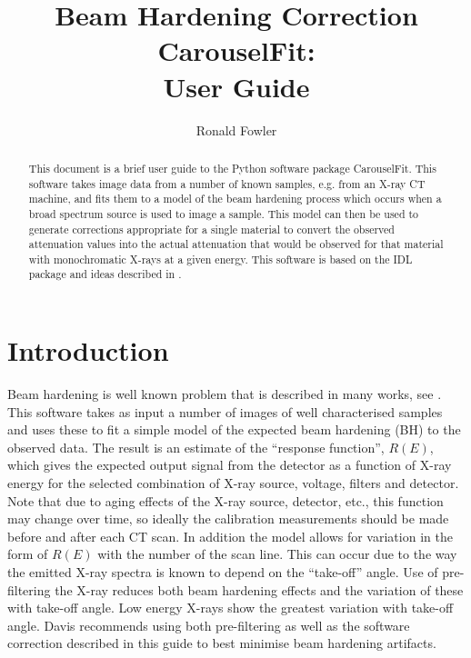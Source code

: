 \documentclass[a4paper,12pt]{article}
\begin{document}
\title{Beam Hardening Correction CarouselFit: \\ User Guide}
\author{Ronald Fowler}

\maketitle

\begin{abstract}
This document is a brief user guide to the Python software package CarouselFit. This software takes image
data from a number of known samples, e.g. from an X-ray CT machine, and fits them to a model of
the beam hardening process which occurs when a broad spectrum source is used to image a sample.
This model can then be used to generate corrections appropriate for a single material to convert
the observed attenuation values into the actual attenuation that would be observed for that material
with monochromatic X-rays at a given energy.
This software is based on the IDL package and ideas described in \cite{davis}.
\end{abstract}

\section{Introduction}

Beam hardening is well known problem that is described in many works, see \cite{davis}.
This software takes as input a number of images of well characterised samples and uses these
to fit a simple model of the expected beam hardening (BH) to the observed data.
The result is an estimate of the ``response function'', $R(E)$, which gives the expected output signal
from the detector as a function of X-ray energy for the selected combination of X-ray source, voltage, filters
and detector.
Note that due to aging effects of the X-ray source, detector, etc., this function may change over time,
so ideally the calibration measurements should be made before and after each CT scan.
In addition the model allows for variation in the form of $R(E)$ with the number of the scan line.
This can occur due to the way the emitted X-ray spectra is known to depend on the ``take-off'' angle\cite{davis}.
Use of pre-filtering the X-ray reduces both beam hardening effects and the variation of these with take-off
angle. Low energy X-rays show the greatest variation with take-off angle.
Davis recommends using both pre-filtering as well as the software correction described in this guide
to best minimise beam hardening artifacts.
\end{document}
